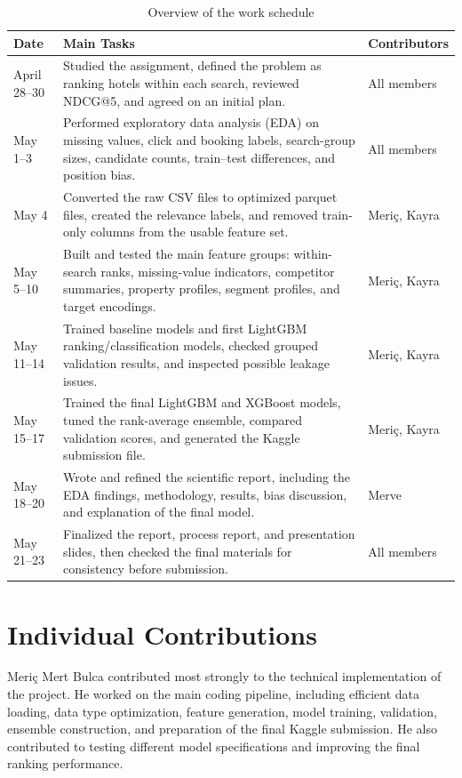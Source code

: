 \documentclass[runningheads]{llncs}
\begin{document}
\begin{table}[h]
\centering
\caption{Overview of the work schedule}
\label{tab:schedule}
\small
\setlength{\tabcolsep}{7pt}
\begin{tabular}{p{2.3cm}p{6.4cm}p{2.8cm}}
\toprule
\textbf{Date} & \textbf{Main Tasks} & \textbf{Contributors} \\
\midrule
April 28--30 & Studied the assignment, defined the problem as ranking hotels within each search, reviewed NDCG@5, and agreed on an initial plan. & All members \\
May 1--3 & Performed exploratory data analysis (EDA) on missing values, click and booking labels, search-group sizes, candidate counts, train--test differences, and position bias. & All members \\
May 4 & Converted the raw CSV files to optimized parquet files, created the relevance labels, and removed train-only columns from the usable feature set. & Meri\c{c}, Kayra \\
May 5--10 & Built and tested the main feature groups: within-search ranks, missing-value indicators, competitor summaries, property profiles, segment profiles, and target encodings. & Meri\c{c}, Kayra \\
May 11--14 & Trained baseline models and first LightGBM ranking/classification models, checked grouped validation results, and inspected possible leakage issues. & Meri\c{c}, Kayra \\
May 15--17 & Trained the final LightGBM and XGBoost models, tuned the rank-average ensemble, compared validation scores, and generated the Kaggle submission file. & Meri\c{c}, Kayra \\
May 18--20 & Wrote and refined the scientific report, including the EDA findings, methodology, results, bias discussion, and explanation of the final model. & Merve \\
May 21--23 & Finalized the report, process report, and presentation slides, then checked the final materials for consistency before submission. & All members \\
\bottomrule
\end{tabular}
\end{table}

\section{Individual Contributions}

Meri\c{c} Mert Bulca contributed most strongly to the technical implementation of the project. He worked on the main coding pipeline, including efficient data loading, data type optimization, feature generation, model training, validation, ensemble construction, and preparation of the final Kaggle submission. He also contributed to testing different model specifications and improving the final ranking performance.
\end{document}
